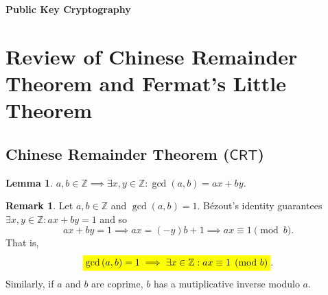 \documentclass{article}
\newcommand{\mathcolorbox}[2]{\colorbox{#1}{$\displaystyle #2$}}
\newtheorem*{lemma*}{Lemma}
\theoremstyle{definition}
\newtheorem*{remark}{Remark}
\newcommand{\Z}{\mathbb{Z}}
\newcommand{\of}[1]{\left( #1 \right)}
\begin{document}
	
	\begin{center}
		\huge\textbf{Public Key Cryptography}\\
		\vspace{0.5em}
	\end{center}
	
	
	\section{Review of Chinese Remainder Theorem and Fermat's Little Theorem}
	\subsection{Chinese Remainder Theorem ($\mathsf{CRT}$)}
	
	\begin{tcolorbox}[colback=white,colframe=lemcolor,arc=5pt,title={\color{white}\bf Bézout's Identity}]
		\begin{lemma*}
			$a,b\in\Z\implies\exists x,y\in\Z:\gcd\of{a,b}=ax+by$.
		\end{lemma*}
	\end{tcolorbox}
	\begin{remark}
		Let $a,b\in\Z$ and $\gcd\of{a,b}=1$. Bézout's identity guarantees $\exists x,y\in\Z:ax+by=1$ and so \[
		ax+by=1\implies ax=(-y)b+1\implies ax\equiv1\pmod{b}.
		\] That is, \[
		\mathcolorbox{-blue}{\gcd\of{a,b}=1\implies\exists x\in\Z:ax\equiv1\pmod{b}}.
		\] Similarly, if $a$ and $b$ are coprime, $b$ has a mutiplicative inverse modulo $a$.
	\end{remark}
	
\end{document}
